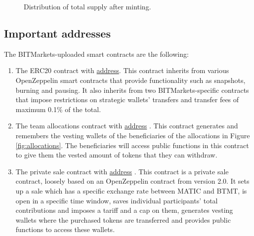 \documentclass[a4paper,12pt]{article}
\begin{document}
\begin{figure}[h!]
\centering
{}
\caption{Distribution of total supply after minting.}
\end{figure}

\subsection{Important addresses}

The BITMarkets-uploaded smart contracts are the following:
\begin{enumerate}
  \item \label{contracts:token} The ERC20 contract with \href{https://polygonscan.com/address/0xf1dcfbA25b8be56c4d706B0C0cf43Ae28E062688}{address}.
  This contract inherits from various OpenZeppelin smart contracts that provide functionality such as snapshots, burning and pausing. It also inherits from two BITMarkets-specific contracts that impose restrictions on strategic wallets' transfers and transfer fees of maximum 0.1\% of the total.

  \item \label{contracts:allocations} The team allocations contract with \href{https://polygonscan.com/address/0x310AD8a6a34a23330aEF455d9B730c32b12935C0}{address} .
  This contract generates and remembers the vesting wallets of the beneficiaries of the allocations in Figure \ref{fig:allocations}. The beneficiaries will access public functions in this contract to give them the vested amount of tokens that they can withdraw.

  \item \label{contracts:privatesale} The private sale contract with \href{https://polygonscan.com/address/0x22844D242cBb9B0D1DAA4af07600084d370EabB8}{address} .
  This contract is a private sale contract, loosely based on an OpenZeppelin contract from version 2.0. It sets up a sale which has a specific exchange rate between MATIC and BTMT, is open in a specific time window, saves individual participants' total contributions and imposes a tariff and a cap on them, generates vesting wallets where the purchased tokens are transferred and provides public functions to access these wallets.

\end{enumerate}
\end{document}
